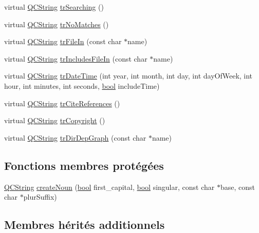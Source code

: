 \begin{DoxyCompactItemize}
\item 
virtual \hyperlink{class_q_c_string}{Q\+C\+String} \hyperlink{class_translator_danish_aab046ce1b4220094347ced6badfadb3b}{tr\+Searching} ()
\item 
virtual \hyperlink{class_q_c_string}{Q\+C\+String} \hyperlink{class_translator_danish_a94da6629b40041ddec9f763aef31ba44}{tr\+No\+Matches} ()
\item 
virtual \hyperlink{class_q_c_string}{Q\+C\+String} \hyperlink{class_translator_danish_a08d0121dfe4f7373b80e51fbd70bc995}{tr\+File\+In} (const char $\ast$name)
\item 
virtual \hyperlink{class_q_c_string}{Q\+C\+String} \hyperlink{class_translator_danish_a3d0c89fe22355600358dc15fec3bbf9a}{tr\+Includes\+File\+In} (const char $\ast$name)
\item 
virtual \hyperlink{class_q_c_string}{Q\+C\+String} \hyperlink{class_translator_danish_a6b1b8f959c432ab7959b2509d0195c1f}{tr\+Date\+Time} (int year, int month, int day, int day\+Of\+Week, int hour, int minutes, int seconds, \hyperlink{qglobal_8h_a1062901a7428fdd9c7f180f5e01ea056}{bool} include\+Time)
\item 
virtual \hyperlink{class_q_c_string}{Q\+C\+String} \hyperlink{class_translator_danish_a5dfbb408f0d3aea6af3b16dbc16974a3}{tr\+Cite\+References} ()
\item 
virtual \hyperlink{class_q_c_string}{Q\+C\+String} \hyperlink{class_translator_danish_ac6e19d1f52eebb5f38cf72ef9fff123c}{tr\+Copyright} ()
\item 
virtual \hyperlink{class_q_c_string}{Q\+C\+String} \hyperlink{class_translator_danish_ad55b27019403e6a5e8148a022259eb75}{tr\+Dir\+Dep\+Graph} (const char $\ast$name)
\end{DoxyCompactItemize}
\subsection*{Fonctions membres protégées}
\begin{DoxyCompactItemize}
\item 
\hyperlink{class_q_c_string}{Q\+C\+String} \hyperlink{class_translator_danish_ac3ca30b3b28709fda517d2970d12cf18}{create\+Noun} (\hyperlink{qglobal_8h_a1062901a7428fdd9c7f180f5e01ea056}{bool} first\+\_\+capital, \hyperlink{qglobal_8h_a1062901a7428fdd9c7f180f5e01ea056}{bool} singular, const char $\ast$base, const char $\ast$plur\+Suffix)
\end{DoxyCompactItemize}
\subsection*{Membres hérités additionnels}


